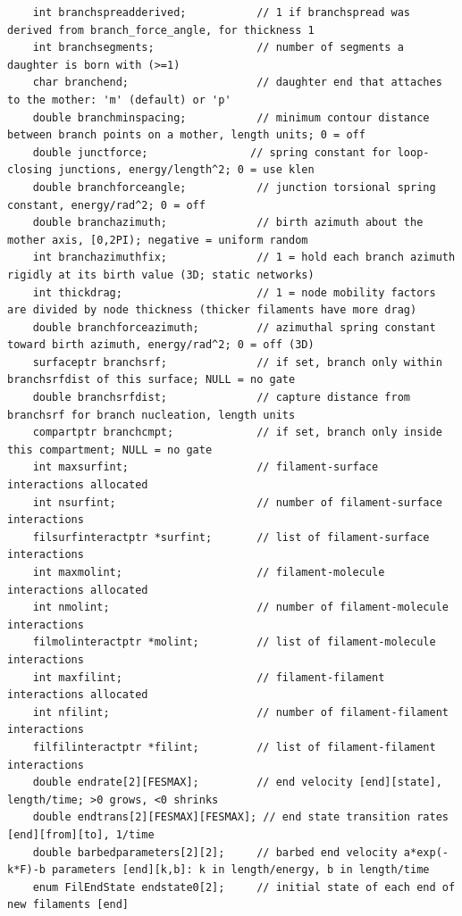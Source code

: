 \documentclass {scrbook}
\begin{document}
\begin{lstlisting}
    int branchspreadderived;           // 1 if branchspread was derived from branch_force_angle, for thickness 1
    int branchsegments;                // number of segments a daughter is born with (>=1)
    char branchend;                    // daughter end that attaches to the mother: 'm' (default) or 'p'
    double branchminspacing;           // minimum contour distance between branch points on a mother, length units; 0 = off
    double junctforce;                // spring constant for loop-closing junctions, energy/length^2; 0 = use klen
    double branchforceangle;           // junction torsional spring constant, energy/rad^2; 0 = off
    double branchazimuth;              // birth azimuth about the mother axis, [0,2PI); negative = uniform random
    int branchazimuthfix;              // 1 = hold each branch azimuth rigidly at its birth value (3D; static networks)
    int thickdrag;                     // 1 = node mobility factors are divided by node thickness (thicker filaments have more drag)
    double branchforceazimuth;         // azimuthal spring constant toward birth azimuth, energy/rad^2; 0 = off (3D)
    surfaceptr branchsrf;              // if set, branch only within branchsrfdist of this surface; NULL = no gate
    double branchsrfdist;              // capture distance from branchsrf for branch nucleation, length units
    compartptr branchcmpt;             // if set, branch only inside this compartment; NULL = no gate
    int maxsurfint;                    // filament-surface interactions allocated
    int nsurfint;                      // number of filament-surface interactions
    filsurfinteractptr *surfint;       // list of filament-surface interactions
    int maxmolint;                     // filament-molecule interactions allocated
    int nmolint;                       // number of filament-molecule interactions
    filmolinteractptr *molint;         // list of filament-molecule interactions
    int maxfilint;                     // filament-filament interactions allocated
    int nfilint;                       // number of filament-filament interactions
    filfilinteractptr *filint;         // list of filament-filament interactions
    double endrate[2][FESMAX];         // end velocity [end][state], length/time; >0 grows, <0 shrinks
    double endtrans[2][FESMAX][FESMAX]; // end state transition rates [end][from][to], 1/time
    double barbedparameters[2][2];     // barbed end velocity a*exp(-k*F)-b parameters [end][k,b]: k in length/energy, b in length/time
    enum FilEndState endstate0[2];     // initial state of each end of new filaments [end]

\end{lstlisting}
\end{document}
